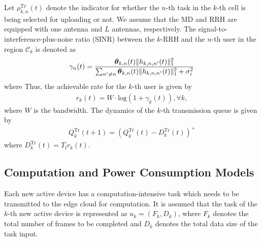 Let $\rho^{\mathrm{Tr}}_{k, n}(t)$ denote the indicator for whether the $n$-th task in the $k$-th cell is being selected for uploading or not.
We assume that the MD and RRH are equipped with one antenna and $L$ antennas, respectively.
The signal-to-interference-plus-noise ratio (SINR) between the $k$-RRH and the $n$-th user in the region $\mathcal{C}_{k}$ is denoted as
\begin{align}
    \gamma_{n}(t) = \frac{
        \boldsymbol{\theta}_{k,n}(t) \lVert h_{k,n,n'}(t)\|_1^2
    }{
        \sum_{n' \neq n} \boldsymbol{\theta}_{k,n}(t) \lVert h_{k,n,n'}(t)\|_1^2 + \sigma_{i}^{2}
    }
\end{align}
where 
Thus, the achievable rate for the $k$-th user is given by
\begin{align}
    r_{k}(t)= W\cdot \text{log}(1+\gamma_{k}(t)), \forall k,
\end{align}
where $W$ is the bandwidth.
The dynamics of the $k$-th transmission queue is given by
\begin{align}
    Q_{k}^{\mathrm{Tr}}(t+1)=(Q_{k}^{\mathrm{Tr}}(t)-D_{k}^{\mathrm{Tr}}(t))^{+}
\end{align}
where $D_{k}^{\mathrm{Tr}}(t)=T_{\mathrm{f}}r_{k}(t)$.

\subsection{Computation and Power Consumption Models}
Each new active device has a computation-intensive task which needs to be transmitted to the edge cloud for computation. It is assumed that the task of the $k$-th new active device is represented as $u_{k}=(F_{k},D_{k})$, where $F_{k}$ denotes the total number of frames to be completed and $D_{k}$ denotes the total data size of the task input.

